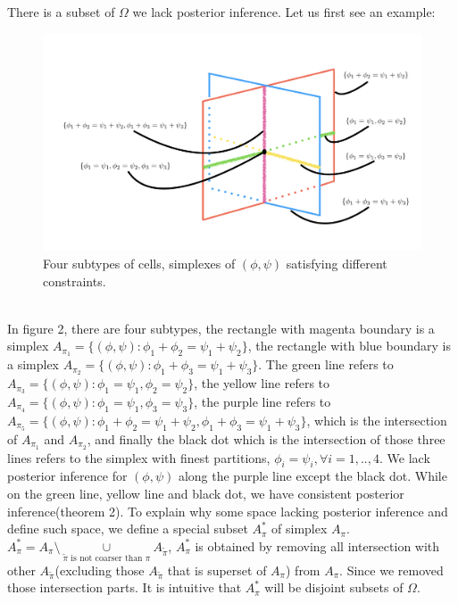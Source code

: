 \documentclass[11pt]{amsart}
\begin{document}
There is a subset of $\Omega$ we lack posterior inference. Let us first see an example:
\begin{figure}[h]
\includegraphics[scale = 0.5]{overlap.png}
 \caption{Four subtypes of cells,  simplexes of $(\phi,\psi)$ satisfying different constraints.}
  \label{fig:1}
\end{figure}
\hfill\\
In figure 2, there are four subtypes, the rectangle with magenta boundary is a simplex $A_{\pi_1} = \{(\phi,\psi) : \phi_1 + \phi_2 = \psi_1 + \psi_2\}$, the rectangle with blue boundary is a simplex $A_{\pi_2} = \{(\phi,\psi) : \phi_1 + \phi_3 = \psi_1 + \psi_3\}$. The green line refers to $A_{\pi_3} = \{(\phi,\psi) : \phi_1 = \psi_1, \phi_2 = \psi_2\}$, the yellow line refers to $A_{\pi_4} = \{(\phi,\psi) : \phi_1 = \psi_1, \phi_3 = \psi_3\}$, the purple line refers to $A_{\pi_5} = \{(\phi,\psi) : \phi_1 + \phi_2 = \psi_1 + \psi_2, \phi_1 + \phi_3 = \psi_1 + \psi_3\}$, which is the intersection of $A_{\pi_1}$ and $A_{\pi_2}$, and finally the black dot which is the intersection of those three lines refers to the simplex with finest partitions, $\phi_i = \psi_i, \forall i = 1,..,4$. We lack posterior inference for $(\phi,\psi)$ along the purple line except the black dot. While on the green line, yellow line and black dot, we have consistent posterior inference(theorem 2). To explain why some space lacking posterior inference and define such space, we define a special subset $A_\pi^*$ of simplex $A_\pi$. $A_\pi^* = A_\pi\setminus \underset{\tilde{\pi} \text{ is not coarser than } \pi }\cup A_{\tilde{\pi}}$, $A_\pi^*$ is obtained by removing all intersection with other $A_{\tilde{\pi}}$(excluding those $A_{\tilde{\pi}}$ that is superset of $A_\pi$) from $A_\pi$. Since we removed those intersection parts. It is intuitive that $A_\pi^*$ will be disjoint subsets of $\Omega$.\\
\end{document}
